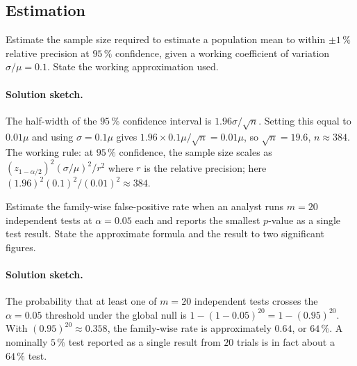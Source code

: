 \subsection*{Estimation}

\begin{exercise}
Estimate the sample size required to estimate a population mean to
within $\pm 1\,\%$ relative precision at $95\,\%$ confidence, given
a working coefficient of variation $\sigma/\mu = 0.1$. State the
working approximation used.

\paragraph{Solution sketch.} The half-width of the $95\,\%$
confidence interval is $1.96 \sigma/\sqrt{n}$. Setting this equal
to $0.01 \mu$ and using $\sigma = 0.1\mu$ gives $1.96 \times
0.1\mu /\sqrt{n} = 0.01\mu$, so $\sqrt{n} = 19.6$, $n \approx
384$. The working rule: at $95\,\%$ confidence, the sample size
scales as $(z_{1-\alpha/2})^{2}(\sigma/\mu)^{2}/r^{2}$ where $r$
is the relative precision; here $(1.96)^{2}(0.1)^{2}/(0.01)^{2}
\approx 384$.
\end{exercise}

\begin{exercise}
Estimate the family-wise false-positive rate when an analyst runs
$m = 20$ independent tests at $\alpha = 0.05$ each and reports the
smallest $p$-value as a single test result. State the approximate
formula and the result to two significant figures.

\paragraph{Solution sketch.} The probability that at least one of
$m = 20$ independent tests crosses the $\alpha = 0.05$ threshold
under the global null is $1 - (1 - 0.05)^{20} = 1 - (0.95)^{20}$.
With $(0.95)^{20} \approx 0.358$, the family-wise rate is
approximately $0.64$, or $64\,\%$. A nominally $5\,\%$ test
reported as a single result from $20$ trials is in fact about a
$64\,\%$ test.
\end{exercise}

